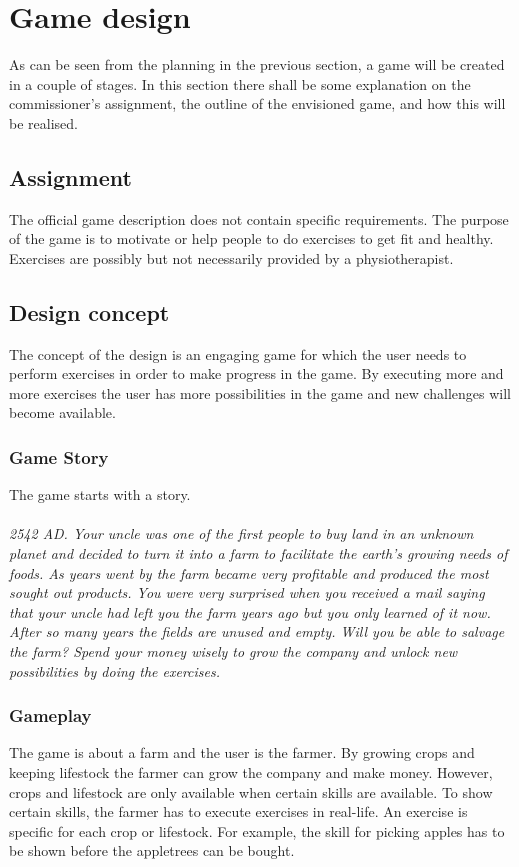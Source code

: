 \documentclass[a4paper,11pt,notitlepage]{report}
\begin{document}
\chapter{Game design}
As can be seen from the planning in the previous section, a game will be created in a couple of stages. In this section there shall be some explanation on the commissioner's assignment, the outline of the envisioned game, and how this will be realised.

\section{Assignment}
The official game description does not contain specific requirements. The purpose of the game is to motivate or help people to do exercises to get fit and healthy. Exercises are possibly but not necessarily provided by a physiotherapist. 

\section{Design concept}
The concept of the design is an engaging game for which the user needs to perform exercises in order to make progress in the game. By executing more and more exercises the user has more possibilities in the game and new challenges will become available. 

\subsection{Game Story}
The game starts with a story. 
\\ 
\\
\textit{2542 AD. Your uncle was one of the first people to buy land in an unknown planet and decided to turn it into a farm to facilitate the earth’s growing needs of foods. As years went by the farm became very profitable and produced the most sought out products. You were very surprised when you received a mail saying that your uncle had left you the farm years ago but you only learned of it now. After so many years the fields are unused and empty. Will you be able to salvage the farm? Spend your money wisely to grow the company and unlock new possibilities by doing the exercises.}

\subsection{Gameplay}
The game is about a farm and the user is the farmer. By growing crops and keeping lifestock the farmer can grow the company and make money. However, crops and lifestock are only available when certain skills are available. To show certain skills, the farmer has to execute exercises in real-life. An exercise is specific for each crop or lifestock. For example, the skill for picking apples has to be shown before the appletrees can be bought. 
\end{document}
